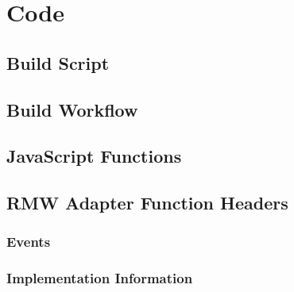\chapter{Code}

\section{Build Script}\label{sec:apxblasm}

    

    \pagebreak

\section{Build Workflow}\label{sec:apxworkflow}

    

    \pagebreak

\section{JavaScript Functions}\label{sec:apxmodule}

    

    \pagebreak

\section{RMW Adapter Function Headers}\label{sec:apxrmw}

    \subsection{Events}

        

    \subsection{Implementation Information}
        

        

        

        

